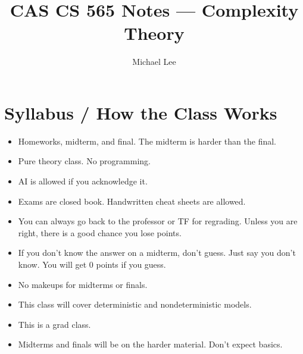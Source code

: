 \documentclass[11pt]{article}
\title{CAS CS 565 Notes — Complexity Theory}
\author{Michael Lee}
\date{}
\begin{document}
\maketitle
\tableofcontents
\newpage

\section{Syllabus / How the Class Works}
\begin{itemize}
    \item Homeworks, midterm, and final. The midterm is harder than the final.
    \item Pure theory class. No programming.
    \item AI is allowed if you acknowledge it.
    \item Exams are closed book. Handwritten cheat sheets are allowed.
    \item You can always go back to the professor or TF for regrading. Unless you are right, there is a good chance you lose points.
    \item If you don't know the answer on a midterm, don't guess. Just say you don't know. You will get 0 points if you guess.
    \item No makeups for midterms or finals.
    \item This class will cover deterministic and nondeterministic models.
    \item This is a grad class.
    \item Midterms and finals will be on the harder material. Don't expect basics.
\end{itemize}
\end{document}
